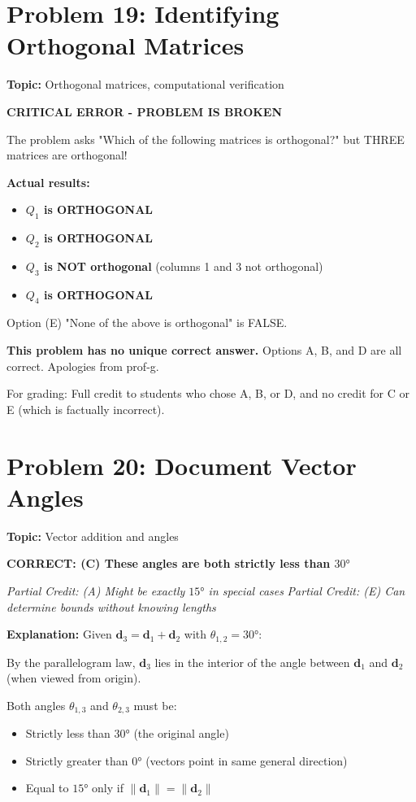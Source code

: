 \documentclass[12pt]{amsart}
\newcommand{\correct}[1]{{\color{blue}\textbf{CORRECT: #1}}}
\newcommand{\partcred}[1]{{\color{red}\textit{Partial Credit: #1}}}
\begin{document}
\hrulefill

\section*{Problem 19: Identifying Orthogonal Matrices}
\textbf{Topic:} Orthogonal matrices, computational verification

\textbf{CRITICAL ERROR - PROBLEM IS BROKEN}

The problem asks "Which of the following matrices is orthogonal?" but THREE matrices are orthogonal!

\textbf{Actual results:}
\begin{itemize}
\item \textbf{$Q_1$ is ORTHOGONAL} 
\item \textbf{$Q_2$ is ORTHOGONAL} 
\item \textbf{$Q_3$ is NOT orthogonal} (columns 1 and 3 not orthogonal)
\item \textbf{$Q_4$ is ORTHOGONAL} 
\end{itemize}

Option (E) "None of the above is orthogonal" is FALSE.

\textbf{This problem has no unique correct answer.} Options A, B, and D are all correct. Apologies from prof-g.

For grading: Full credit to students who chose A, B, or D, and no credit for C or E (which is factually incorrect).

\hrulefill

\hrulefill

\section*{Problem 20: Document Vector Angles}
\textbf{Topic:} Vector addition and angles

\correct{(C) These angles are both strictly less than $30°$}

\partcred{(A) Might be exactly $15°$ in special cases}
\partcred{(E) Can determine bounds without knowing lengths}

\textbf{Explanation:} 
Given $\mathbf{d}_3 = \mathbf{d}_1 + \mathbf{d}_2$ with $\theta_{1,2} = 30°$:

By the parallelogram law, $\mathbf{d}_3$ lies in the interior of the angle between $\mathbf{d}_1$ and $\mathbf{d}_2$ (when viewed from origin).

Both angles $\theta_{1,3}$ and $\theta_{2,3}$ must be:
\begin{itemize}
\item Strictly less than $30°$ (the original angle)
\item Strictly greater than $0°$ (vectors point in same general direction)
\item Equal to $15°$ only if $\|\mathbf{d}_1\| = \|\mathbf{d}_2\|$
\end{itemize}
\end{document}
